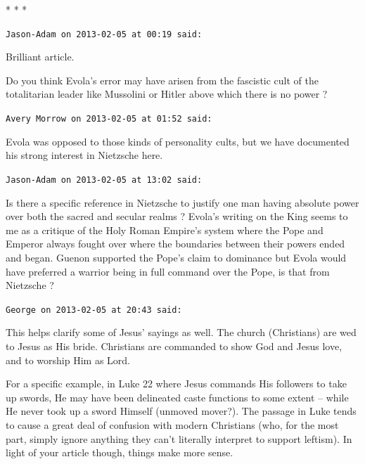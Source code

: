 
\begin{center}* * *\end{center}

\begin{footnotesize}
\begin{sffamily}
\texttt{Jason-Adam on 2013-02-05 at 00:19 said:}

Brilliant article.

Do you think Evola's error may have arisen from the fascistic cult of the totalitarian leader like Mussolini or Hitler above which there is no power ?

\hfill

\texttt{Avery Morrow on 2013-02-05 at 01:52 said:}

Evola was opposed to those kinds of personality cults, but we have documented his strong interest in Nietzsche here.

\hfill

\texttt{Jason-Adam on 2013-02-05 at 13:02 said:}

Is there a specific reference in Nietzsche to justify one man having absolute power over both the sacred and secular realms ? Evola's writing on the King seems to me as a critique of the Holy Roman Empire's system where the Pope and Emperor always fought over where the boundaries between their powers ended and began. Guenon supported the Pope's claim to dominance but Evola would have preferred a warrior being in full command over the Pope, is that from Nietzsche ?

\hfill

\texttt{George on 2013-02-05 at 20:43 said:}

This helps clarify some of Jesus' sayings as well. The church (Christians) are wed to Jesus as His bride. Christians are commanded to show God and Jesus love, and to worship Him as Lord.

For a specific example, in Luke 22 where Jesus commands His followers to take up swords, He may have been delineated caste functions to some extent -- while He never took up a sword Himself (unmoved mover?). The passage in Luke tends to cause a great deal of confusion with modern Christians (who, for the most part, simply ignore anything they can't literally interpret to support leftism). In light of your article though, things make more sense.


\hfill

\end{sffamily}
\end{footnotesize}

